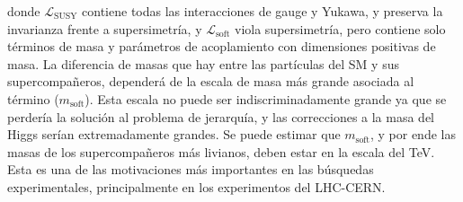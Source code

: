 \noindent
donde $\mathcal{L}_{\text{SUSY}}$ contiene todas las interacciones de gauge y Yukawa, y preserva la invarianza frente a supersimetría, y $\mathcal{L}_{\text{soft}}$ viola supersimetría, pero contiene solo términos de masa y parámetros de acoplamiento con dimensiones positivas de masa. La diferencia de masas que hay entre las partículas del SM y sus supercompañeros, dependerá de la escala de masa más grande asociada al término  ($m_{\text{soft}}$). Esta escala no puede ser indiscriminadamente grande ya que se perdería la solución al problema de jerarquía, y  las correcciones a la masa del Higgs serían extremadamente grandes. Se puede estimar 
que $m_{\text{soft}}$, y por ende las masas de los supercompañeros más livianos, deben estar en la escala del TeV. Esta es una de las motivaciones más importantes en las búsquedas experimentales, principalmente en los experimentos del LHC-CERN.



